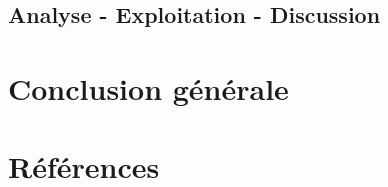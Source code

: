 \documentclass{article}
\begin{document}
		\subsection{Analyse - Exploitation - Discussion}


	\newpage

	\section{Conclusion générale}


	\newpage

	\section{Références}


	\newpage
\end{document}

